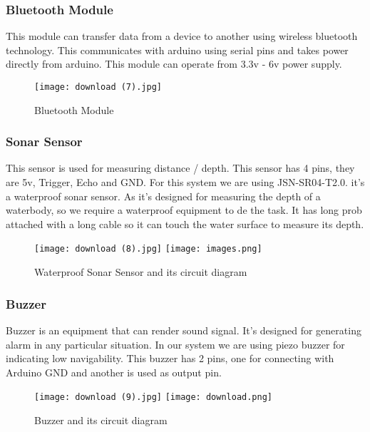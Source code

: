 \documentclass[12pt, top = 1 inch, bottom = 1 inch, left = 1.2 inch, top = .8 inch]{book}
\begin{document}
			\subsubsection{Bluetooth Module}
			This module can transfer data from a device to another using wireless bluetooth technology. This communicates with arduino using serial pins and takes power directly from arduino. This module can operate from 3.3v - 6v power supply. 
			\begin{figure}[h!]	
				\centering
				\texttt{[image: download (7).jpg]}
				\caption{Bluetooth Module}
			\end{figure}
			\newpage
			\subsubsection{Sonar Sensor}
			This sensor is used for measuring distance / depth. This sensor has 4 pins, they are 5v, Trigger, Echo and GND. For this system we are using JSN-SR04-T2.0. it’s a waterproof sonar sensor. As it’s designed for measuring the depth of a waterbody, so we require a waterproof equipment to de the task. It has long prob attached with a long cable so it can touch the water surface to measure its depth. 
			\begin{figure}
				\centering
				\texttt{[image: download (8).jpg]}
				\texttt{[image: images.png]}
				\caption{Waterproof Sonar Sensor and its circuit diagram}
			\end{figure}
			\newpage
			\subsubsection{Buzzer}
			Buzzer is an equipment that can render sound signal. It’s designed for generating alarm in any particular situation. In our system we are using piezo buzzer for indicating low navigability. This buzzer has 2 pins, one for connecting with Arduino GND and another is used as output pin. 
			\begin{figure}[p]	
				\centering
				\texttt{[image: download (9).jpg]}
				\texttt{[image: download.png]}
				\caption{Buzzer and its circuit diagram}
			\end{figure}
			\newpage
\end{document}
